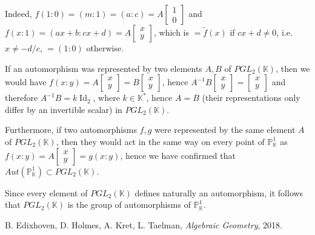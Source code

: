 \documentclass{article}
\newcommand{\numberset}{\mathbb}
\newcommand{\K}{\numberset{K}}
\newcommand{\Ps}{\mathbb{P}}
\DeclareMathOperator{\Id}{Id}
\begin{document}
Indeed, $f(1:0)=(m:1)=(a:c)=A \begin{bmatrix} 1 \\ 0 \end{bmatrix}$ and $f(x:1)=(ax+b:cx+d)=A \begin{bmatrix} x \\ y \end{bmatrix}$, which is $=\tilde{f}(x)$ if $cx+d\neq 0$, i.e. $x\neq -d/c$, $=(1:0)$ otherwise.

If an automorphism was represented by two elements $A,B$ of $PGL_2(\K)$, then we would have $f(x:y)=A\begin{bmatrix} x \\ y \end{bmatrix}=B\begin{bmatrix} x \\ y \end{bmatrix}$, hence $A^{-1}B\begin{bmatrix} x \\ y \end{bmatrix}=\begin{bmatrix} x \\ y \end{bmatrix}$ and therefore $A^{-1}B=k\Id_2$, where $k\in\K^*$, hence $A=B$ (their representations only differ by an invertible scalar) in $PGL_2(\K)$.

Furthermore, if two automorphisms $f,g$ were represented by the same element $A$ of $PGL_2(\K)$, then they would act in the same way on every point of $\Ps^1_{\K}$ as $f(x:y)=A\begin{bmatrix} x \\ y \end{bmatrix}=g(x:y)$, hence we have confirmed that $Aut(\Ps^1_{\K})\subset PGL_2(\K)$.

Since every element of $PGL_2(\K)$ defines naturally an automorphism, it follows that $PGL_2(\K)$ is the group of automorphisms of $\Ps^1_{\K}$.





\begin{thebibliography}{9}
	B. Edixhoven, D. Holmes, A. Kret, L. Taelman,
	\textit{Algebraic Geometry},
	2018.
\end{thebibliography}
\end{document}
